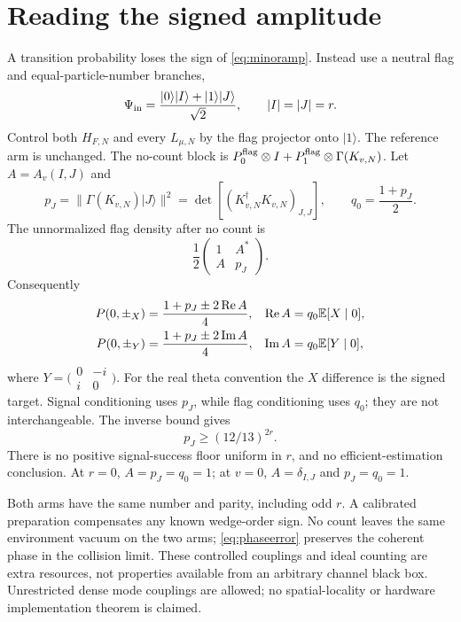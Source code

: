 \documentclass[11pt,letterpaper]{article}
\numberwithin{equation}{section}
\theoremstyle{remark}
\newcommand{\E}{\mathbb E}
\newcommand{\ket}[1]{\lvert #1\rangle}
\begin{document}
\section{Reading the signed amplitude}
\label{sec:readout}
A transition probability loses the sign of \eqref{eq:minoramp}.
Instead use a neutral flag and equal-particle-number branches,
\begin{equation}
 \Psi_{\rm in}=\frac{\ket0\ket I+\ket1\ket J}{\sqrt2},
 \qquad |I|=|J|=r. \label{eq:flaginput}
\end{equation}
Control both $H_{F,N}$ and every $L_{\mu,N}$ by the flag projector
onto $\ket1$. The reference arm is unchanged. The no-count block is
$P_0^{\rm flag}\otimes I+P_1^{\rm flag}\otimes\Gamma(K_{v,N})$.
Let $A=A_v(I,J)$ and
\begin{equation}
 p_J=\|\Gamma(K_{v,N})\ket J\|^2
     =\det[(K_{v,N}^\dagger K_{v,N})_{J,J}],\qquad
 q_0=\frac{1+p_J}{2}. \label{eq:success}
\end{equation}
The unnormalized flag density after no count is
\begin{equation}
 \frac12\begin{pmatrix}1&A^*\\A&p_J\end{pmatrix}. \label{eq:flagmatrix}
\end{equation}
Consequently
\begin{align}
 P(0,\pm_X)&=\frac{1+p_J\pm2\operatorname{Re}A}{4},&
 \operatorname{Re}A&=q_0\E[X\mid0],\notag\\
 P(0,\pm_Y)&=\frac{1+p_J\pm2\operatorname{Im}A}{4},&
 \operatorname{Im}A&=q_0\E[Y\mid0], \label{eq:readout}
\end{align}
where $Y=\bigl(\begin{smallmatrix}0&-i\\i&0\end{smallmatrix}\bigr)$.
For the real theta convention the $X$ difference is the signed target.
Signal conditioning uses $p_J$, while flag conditioning uses $q_0$;
they are not interchangeable. The inverse bound gives
\begin{equation}
 p_J\ge(12/13)^{2r}. \label{eq:survival}
\end{equation}
There is no positive signal-success floor uniform in $r$, and no
efficient-estimation conclusion. At $r=0$, $A=p_J=q_0=1$; at $v=0$,
$A=\delta_{I,J}$ and $p_J=q_0=1$.

Both arms have the same number and parity, including odd $r$.
A calibrated preparation compensates any known wedge-order sign.
No count leaves the same environment vacuum on the two arms;
\eqref{eq:phaseerror} preserves the coherent phase in the collision
limit. These controlled couplings and ideal counting are extra resources,
not properties available from an arbitrary channel black box.
Unrestricted dense mode couplings are allowed; no spatial-locality
or hardware implementation theorem is claimed.
\end{document}
